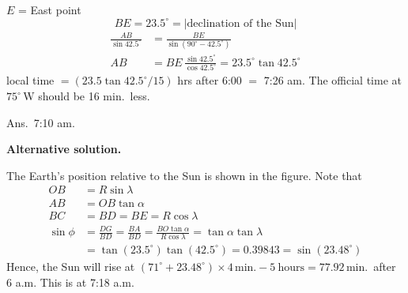 $E$ = East point
\[
  BE = 23.5^\circ = |\text{declination of the Sun}|
\]
\begin{align*}
  \frac{AB}{\sin 42.5^\circ} &= \frac{BE}{\sin\left(90^\circ - 42.5^\circ\right)} \\
  AB &= BE\,\frac{\sin 42.5^\circ}{\cos 42.5^\circ} = 23.5^\circ \tan 42.5^\circ
\end{align*}
local time $= (23.5 \tan 42.5^\circ / 15)$ hrs after 6:00 $=$ 7:26 am. The
official time at $75^\circ$\,W should be 16 min.\ less.

Ans.\ 7:10 am.

\medskip
\noindent\textbf{Alternative solution.}

The Earth's position relative to the Sun is shown in the figure. Note that
\begin{align*}
  OB &= R\sin\lambda \\
  AB &= OB\tan\alpha \\
  BC &= BD = BE = R\cos\lambda \\
  \sin\phi &= \frac{DG}{BD} = \frac{BA}{BD}
    = \frac{BO\tan\alpha}{R\cos\lambda} = \tan\alpha\tan\lambda \\
  &= \tan\left(23.5^\circ\right)\tan\left(42.5^\circ\right)
    = 0.39843 = \sin(23.48^\circ)
\end{align*}
Hence, the Sun will rise at
$\left(71^\circ + 23.48^\circ\right) \times 4\,\text{min.} - 5\ \text{hours}
= 77.92$\,min.\ after 6 a.m. This is at 7:18 a.m.

